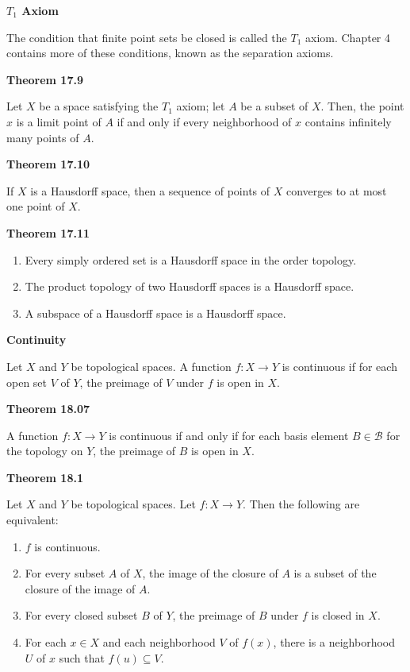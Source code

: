 \documentclass{article}
\newcommand{\B}{\mathcal B}
\begin{document}
\medskip\noindent\textbf{$T_1$ Axiom}

    The condition that finite point sets be closed is called the $T_1$ axiom. Chapter 4 contains more of these conditions, known as the separation axioms.

\medskip\noindent\textbf{Theorem 17.9}

    Let $X$ be a space satisfying the $T_1$ axiom; let $A$ be a subset of $X$. Then, the point $x$ is a limit point of $A$ if and only if every neighborhood of $x$ contains infinitely many points of $A$.

\medskip\noindent\textbf{Theorem 17.10}

    If $X$ is a Hausdorff space, then a sequence of points of $X$ converges to at most one point of $X$.

\medskip\noindent\textbf{Theorem 17.11}
    \begin{enumerate}
    \item Every simply ordered set is a Hausdorff space in the order topology.
    \item The product topology of two Hausdorff spaces is a Hausdorff space.
    \item A subspace of a Hausdorff space is a Hausdorff space.
    \end{enumerate}

\medskip\noindent\textbf{Continuity}

    Let $X$ and $Y$ be topological spaces. A function $f: X \to Y$ is continuous if for each open set $V$ of $Y$, the preimage of $V$ under $f$ is open in $X$.

\medskip\noindent\textbf{Theorem 18.07}

    A function $f: X \to Y$ is continuous if and only if for each basis element $B \in \B$ for the topology on $Y$, the preimage of $B$ is open in $X$.

\medskip\noindent\textbf{Theorem 18.1}

    Let $X$ and $Y$ be topological spaces. Let $f: X \to Y$. Then the following are equivalent:
    \begin{enumerate}
        \item $f$ is continuous.
        \item For every subset $A$ of $X$, the image of the closure of $A$ is a subset of the closure of the image of $A$.
        \item For every closed subset $B$ of $Y$, the preimage of $B$ under $f$ is closed in $X$.
        \item For each $x \in X$ and each neighborhood $V$ of $f(x)$, there is a neighborhood $U$ of $x$ such that $f(u) \subseteq V$.
    \end{enumerate}
\end{document}
